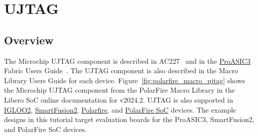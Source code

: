 \section{UJTAG}
\label{sec:ujtag}

\subsection{Overview}

The Microchip UJTAG component is described in
AC227~\cite{Microchip_AC227_2015} and in the
\href{https://www.microchip.com/en-us/products/fpgas-and-plds/fpgas/proasic-3-fpgas}
{ProASIC3} Fabric Users Guide~\cite{Microchip_PA3_UG_2012}.
%
The UJTAG component is also described in the Macro Library Users Guide for
each device.
%
Figure~\ref{fig:polarfire_macro_ujtag} shows the Microchip UJTAG component from
the PolarFire Macro Library in the Libero SoC online documentation for v2024.2.
%
UJTAG is also supported in
\href{https://www.microchip.com/en-us/products/fpgas-and-plds/fpgas/igloo-2-fpgas}
{IGLOO2},
\href{https://www.microchip.com/en-us/products/fpgas-and-plds/system-on-chip-fpgas/smartfusion-2-fpgas}
{SmartFusion2},
\href{https://www.microchip.com/en-us/products/fpgas-and-plds/fpgas/polarfire-fpgas/polarfire-mid-range-fpgas}
{Polarfire}, and
\href{https://www.microchip.com/en-us/products/fpgas-and-plds/system-on-chip-fpgas/polarfire-soc-fpgas}
{PolarFire SoC} devices.
%
The example designs in this tutorial target evaluation boards for
the ProASIC3, SmartFusion2, and PolarFire SoC devices.


